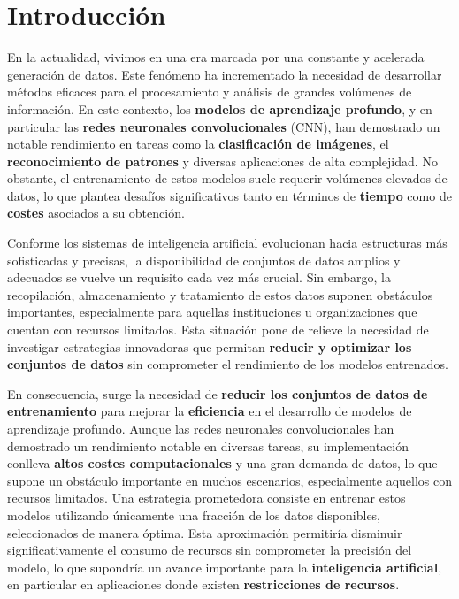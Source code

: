 
\chapter{Introducción}\label{ch:introduccion}

En la actualidad, vivimos en una era marcada por una constante y acelerada generación de datos.
Este fenómeno ha incrementado la necesidad de desarrollar métodos eficaces para el procesamiento y análisis de grandes
volúmenes de información.
En este contexto, los \textbf{modelos de aprendizaje profundo}, y en particular las
\textbf{redes neuronales convolucionales} (CNN), han demostrado un notable rendimiento en tareas como la
\textbf{clasificación de imágenes}, el \textbf{reconocimiento de patrones} y diversas aplicaciones de alta complejidad.
No obstante, el entrenamiento de estos modelos suele requerir volúmenes elevados de datos, lo que plantea desafíos
significativos tanto en términos de \textbf{tiempo} como de \textbf{costes} asociados a su obtención.



Conforme los sistemas de inteligencia artificial evolucionan hacia estructuras más sofisticadas y precisas, la
disponibilidad de conjuntos de datos amplios y adecuados se vuelve un requisito cada vez más crucial.
Sin embargo, la recopilación, almacenamiento y tratamiento de estos datos suponen obstáculos importantes, especialmente
para aquellas instituciones u organizaciones que cuentan con recursos limitados.
Esta situación pone de relieve la necesidad de investigar estrategias innovadoras que permitan
\textbf{reducir y optimizar los conjuntos de datos} sin comprometer el rendimiento de los modelos entrenados.


En consecuencia, surge la necesidad de \textbf{reducir los conjuntos de datos de entrenamiento}
para mejorar la \textbf{eficiencia} en el desarrollo de modelos de aprendizaje profundo.
Aunque las redes neuronales convolucionales han demostrado un rendimiento notable en diversas tareas, su implementación
conlleva \textbf{altos costes computacionales} y una gran demanda de datos, lo que  supone un obstáculo importante en muchos escenarios,
especialmente aquellos con recursos limitados.
Una estrategia prometedora consiste en entrenar estos modelos utilizando únicamente una fracción de los datos
disponibles, seleccionados de manera óptima.
Esta aproximación permitiría disminuir significativamente el consumo de recursos sin comprometer la precisión del
modelo, lo que supondría un avance importante para la \textbf{inteligencia artificial}, en particular en aplicaciones
donde existen \textbf{restricciones de recursos}.


